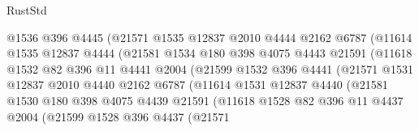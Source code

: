 \begin{lexlean}{RustStd}
\begin{coremodule}
{\begin{coremodule}
{{{{{{{{{{{{{{{{{{{{{{{{{{{{{{{                          @1536
                          @396
                          @4445
                          (@21571
                            @1535
                            @12837
                            @2010
                            @4444
                            @2162
                            @6787
                            (@11614
                              @1535
                              @12837
                              @4444
                              (@21581
                                @1534
                                @180
                                @398
                                @4075
                                @4443
                                @21591
                                (@11618
                                  @1532
                                  @82
                                  @396
                                  @11
                                  @4441
                                  @2004
                                  (@21599
                                    @1532
                                    @396
                                    @4441
                                    (@21571
                                      @1531
                                      @12837
                                      @2010
                                      @4440
                                      @2162
                                      @6787
                                      (@11614
                                        @1531
                                        @12837
                                        @4440
                                        (@21581
                                          @1530
                                          @180
                                          @398
                                          @4075
                                          @4439
                                          @21591
                                          (@11618
                                            @1528
                                            @82
                                            @396
                                            @11
                                            @4437
                                            @2004
                                            (@21599
                                              @1528
                                              @396
                                              @4437
                                              (@21571
}}}}}}}}}}}}}}}}}}}}}}}}}}}}}}}
\end{coremodule}}
\end{coremodule}
\end{lexlean}
